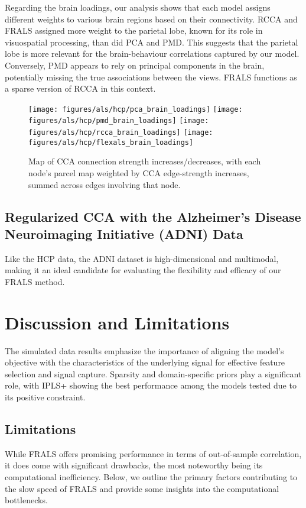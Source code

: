 Regarding the brain loadings, our analysis shows that each model assigns different weights to various brain regions
based on their connectivity.
RCCA and FRALS assigned more weight to the parietal lobe, known for its role in visuospatial processing, than did PCA and PMD. This suggests that the parietal lobe is more relevant for the brain-behaviour correlations captured by our model.
Conversely, PMD appears to rely on principal components in the brain, potentially missing the true associations between the views.
FRALS functions as a sparse version of RCCA in this context.

\begin{figure}[h]
\centering
\texttt{[image: figures/als/hcp/pca\_brain\_loadings]}
\texttt{[image: figures/als/hcp/pmd\_brain\_loadings]}
\texttt{[image: figures/als/hcp/rcca\_brain\_loadings]}
\texttt{[image: figures/als/hcp/flexals\_brain\_loadings]}
\caption*{Map of CCA connection strength increases/decreases, with each node’s parcel map weighted by CCA edge-strength increases, summed across edges involving that node.}
\label{fig:brain}
\end{figure}

\subsection{Regularized CCA with the Alzheimer's Disease Neuroimaging Initiative (ADNI) Data}

Like the HCP data, the ADNI dataset is high-dimensional and multimodal, making it an ideal candidate for evaluating the flexibility and efficacy of our FRALS method.




\section{Discussion and Limitations}

The simulated data results emphasize the importance of aligning the model's objective with the characteristics of
the underlying signal for effective feature selection and signal capture.
Sparsity and domain-specific priors play a significant role, with IPLS+ showing the best performance among the models tested due to its positive constraint.

\subsection{Limitations}
While FRALS offers promising performance in terms of out-of-sample correlation, it does come with significant drawbacks, the most noteworthy being its computational inefficiency. Below, we outline the primary factors contributing to the slow speed of FRALS and provide some insights into the computational bottlenecks.

